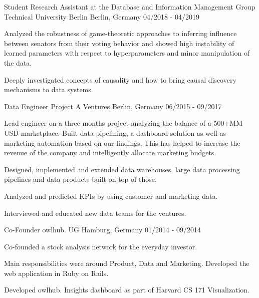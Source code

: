 \begin{cventries}
  \cventry
    {Student Research Assistant at the Database and Information Management Group} %
    {Technical University Berlin} %
    {Berlin, Germany} %
    {04/2018 - 04/2019} %
    {
      \begin{cvitems} %
      \item{Analyzed the robustness of game-theoretic approaches to inferring influence between senators from their voting behavior and showed high instability of learned parameters with respect to hyperparameters and minor manipulation of the data.}
      \item{Deeply investigated concepts of causality and how to bring causal discovery mechanisms to data systems.}
      \end{cvitems}
    }

  \cventry
    {Data Engineer} %
    {Project A Ventures} %
    {Berlin, Germany} %
    {06/2015 - 09/2017} %
    {
      \begin{cvitems} %
        \item {Lead engineer on a three months project analyzing the balance of a 500+MM USD marketplace. Built data pipelining, a dashboard solution as well as marketing automation based on our findings. This has helped to increase the revenue of the company and intelligently allocate marketing budgets.}
        \item {Designed, implemented and extended data warehouses, large data processing pipelines and data products built on top of those.}
        \item {Analyzed and predicted KPIs by using customer and marketing data.}
        \item{Interviewed and educated new data teams for the ventures.}
      \end{cvitems}
    }

  \cventry
    {Co-Founder} %
    {owlhub. UG} %
    {Hamburg, Germany} %
    {01/2014 - 09/2014} %
    {
      \begin{cvitems} %
      \item{Co-founded a stock analysis network for the everyday investor.}
      \item{Main responsibilities were around Product, Data and Marketing. Developed the web application in Ruby on Rails.}
      \item{Developed owlhub. Insights dashboard as part of Harvard CS 171 Visualization.}
      \end{cvitems}
    }


\end{cventries}
